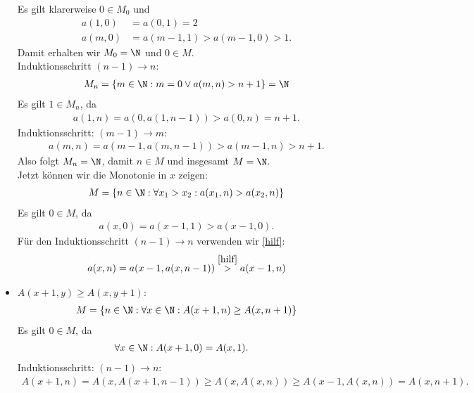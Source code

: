 \begin{solution}
\begin{itemize}
  Es gilt klarerweise $0 \in M_0$ und
  \begin{align*}
    a(1,0) &= a(0,1) = 2 \\
    a(m,0) &= a(m-1,1) > a(m-1,0) > 1.
  \end{align*}
  Damit erhalten wir $M_0 = \N$ und $0 \in M$. \\
  Induktionsschritt $(n-1) \rightarrow n$:
  \begin{align*}
    M_n =  \{m \in \N: m = 0 \lor a(m,n) > n + 1\} = \N
  \end{align*}
  Es gilt $1 \in M_n$, da
  \begin{align*}
    a(1,n) = a(0,a(1,n-1)) > a(0,n) = n + 1.
  \end{align*}
  Induktionsschritt: $(m-1) \rightarrow m$:
  \begin{align*}
    a(m,n) = a(m-1,a(m,n-1)) > a(m-1,n) > n + 1.
  \end{align*}
  Also folgt $M_n = \N$, damit $n \in M$ und insgesamt $M = \N$. \\
  Jetzt können wir die Monotonie in $x$ zeigen:
  \begin{align*}
    M = \{n \in \N: \forall x_1 > x_2: a(x_1,n) > a(x_2,n)\}
  \end{align*}
  Es gilt $0 \in M$, da
  \begin{align*}
    a(x,0) = a(x-1,1) > a(x-1,0).
  \end{align*}
  Für den Induktionsschritt $(n-1) \rightarrow n$ verwenden wir \eqref{hilf}:
  \begin{align*}
    a(x,n) = a(x-1,a(x,n-1)) \stackrel{\eqref{hilf}}{>} a(x-1,n)
  \end{align*}
  \item $A(x+1,y) \geq A(x,y+1)$:
  \begin{align*}
    M = \{n \in \N: \forall x \in \N: A(x+1,n) \geq A(x,n+1)\}
  \end{align*}
  Es gilt $0 \in M$, da
  \begin{align*}
    \forall x \in \N: A(x+1,0) &= A(x,1).
  \end{align*}
  Induktionsschritt: $(n-1) \rightarrow n$:
  \begin{align*}
    A(x+1,n) = A(x,A(x+1,n-1)) \geq A(x,A(x,n)) \geq A(x-1,A(x,n)) = A(x,n+1).
  \end{align*}
\end{itemize}

\end{solution}
